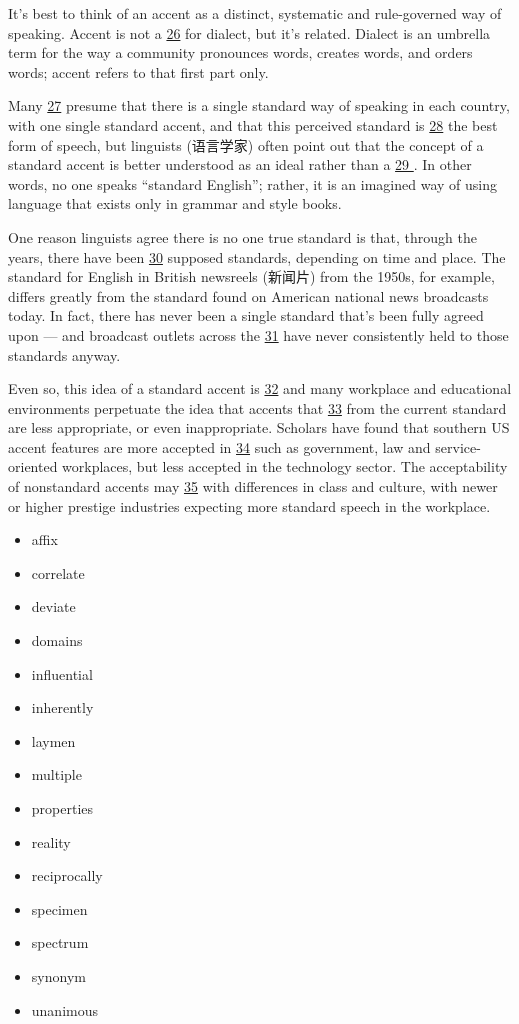 \documentclass[UTF8,11pt]{ctexart}
\begin{document}
It’s best to think of an accent as a distinct, systematic and rule-governed way of speaking. Accent is not a \uline{26} for dialect, but it’s related. Dialect is an umbrella term for the way a community pronounces words, creates words, and orders words; accent refers to that first part only.


Many \uline{27} presume that there is a single standard way of speaking in each country, with one single standard accent, and that this perceived standard is \uline{28} the best form of speech, but linguists (语言学家) often point out that the concept of a standard accent is better understood as an ideal rather than a \uline{29 }. In other words, no one speaks “standard English”; rather, it is an imagined way of using language that exists only in grammar and style books.


One reason linguists agree there is no one true standard is that, through the years, there have been \uline{30} supposed standards, depending on time and place. The standard for English in British newsreels (新闻片) from the 1950s, for example, differs greatly from the standard found on American national news broadcasts today. In fact, there has never been a single standard that’s been fully agreed upon — and broadcast outlets across the \uline{31} have never consistently held to those standards anyway.


Even so, this idea of a standard accent is \uline{32} and many workplace and educational environments perpetuate the idea that accents that \uline{33} from the current standard are less appropriate, or even inappropriate. Scholars have found that southern US accent features are more accepted in \uline{34} such as government, law and service-oriented workplaces, but less accepted in the technology sector. The acceptability of nonstandard accents may \uline{35} with differences in class and culture, with newer or higher prestige industries expecting more standard speech in the workplace.


\begin{itemize}[leftmargin=2em,itemsep=.2em,topsep=.4em]\item[A.] affix
\item[B.] correlate
\item[C.] deviate
\item[D.] domains
\item[E.] influential
\item[F.] inherently
\item[G.] laymen
\item[H.] multiple
\item[I.] properties
\item[J.] reality
\item[K.] reciprocally
\item[L.] specimen
\item[M.] spectrum
\item[N.] synonym
\item[O.] unanimous
\end{itemize}
\end{document}
